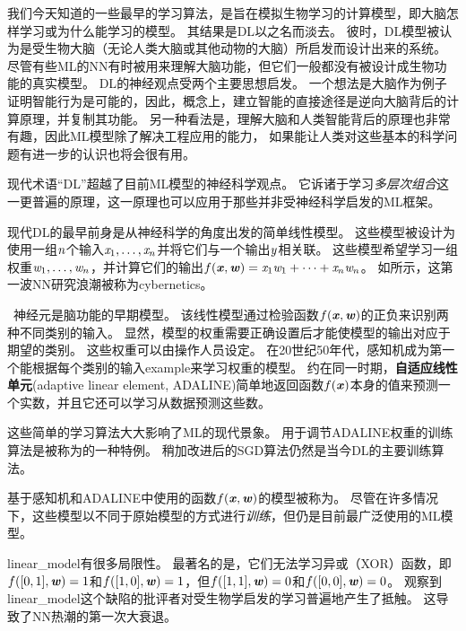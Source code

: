 
我们今天知道的一些最早的学习算法，是旨在模拟生物学习的计算模型，即大脑怎样学习或为什么能学习的模型。
其结果是\gls{DL}以之名而淡去。
彼时，\gls{DL}模型被认为是受生物大脑（无论人类大脑或其他动物的大脑）所启发而设计出来的系统。
尽管有些\gls{ML}的\gls{NN}有时被用来理解大脑功能\citep{hinton1991lesioning}，但它们一般都没有被设计成生物功能的真实模型。
\gls{DL}的神经观点受两个主要思想启发。
一个想法是大脑作为例子证明智能行为是可能的，因此，概念上，建立智能的直接途径是逆向大脑背后的计算原理，并复制其功能。
另一种看法是，理解大脑和人类智能背后的原理也非常有趣，因此\gls{ML}模型除了解决工程应用的能力， 如果能让人类对这些基本的科学问题有进一步的认识也将会很有用。

  
现代术语``\gls{DL}''超越了目前\gls{ML}模型的神经科学观点。
它诉诸于学习\emph{多层次组合}这一更普遍的原理，这一原理也可以应用于那些并非受神经科学启发的\gls{ML}框架。
 
 
现代\gls{DL}的最早前身是从神经科学的角度出发的简单线性模型。
这些模型被设计为使用一组$\mathit{n}$个输入$\mathit{x}_1, \dots ,\mathit{x}_n$并将它们与一个输出$\mathit{y}$相关联。 
这些模型希望学习一组权重$\mathit{w}_1, \dots, \mathit{w}_n $，并计算它们的输出$f(\boldsymbol{\mathit{x}}, \boldsymbol{\mathit{w}}) = \mathit{x}_1 \mathit{w}_1 + \dots + \mathit{x}_n \mathit{w}_n$。
如所示，这第一波\gls{NN}研究浪潮被称为\gls{cybernetics}。

~神经元\citep{McCulloch43}是脑功能的早期模型。
该线性模型通过检验函数$f(\boldsymbol{\mathit{x}},\boldsymbol{\mathit{w}})$的正负来识别两种不同类别的输入。
显然，模型的权重需要正确设置后才能使模型的输出对应于期望的类别。
这些权重可以由操作人员设定。
在20世纪50年代，感知机\citep{Rosenblatt-1956,Rosenblatt-1958}成为第一个能根据每个类别的输入\gls{example}来学习权重的模型。
约在同一时期，\textbf{自适应线性单元}(adaptive linear element, ADALINE)简单地返回函数$f(\boldsymbol{\mathit{x}})$本身的值来预测一个实数\citep{Widrow60}，并且它还可以学习从数据预测这些数。

这些简单的学习算法大大影响了\gls{ML}的现代景象。
用于调节ADALINE权重的训练算法是被称为的一种特例。
稍加改进后的\gls{SGD}算法仍然是当今\gls{DL}的主要训练算法。

基于感知机和ADALINE中使用的函数$f(\boldsymbol{\mathit{x}}, \boldsymbol{\mathit{w}})$的模型被称为。
尽管在许多情况下，这些模型以不同于原始模型的方式进行\emph{训练}，但仍是目前最广泛使用的\gls{ML}模型。

\gls{linear_model}有很多局限性。
最著名的是，它们无法学习异或（XOR）函数，即$f([0,1], \boldsymbol{\mathit{w}}) = 1$和$f([1,0], \boldsymbol{\mathit{w}})=1$，但$f([1,1], \boldsymbol{\mathit{w}})=0$和$f([0,0],\boldsymbol{\mathit{w}})= 0$。
观察到\gls{linear_model}这个缺陷的批评者对受生物学启发的学习普遍地产生了抵触\citep{Minsky69}。
这导致了\gls{NN}热潮的第一次大衰退。

